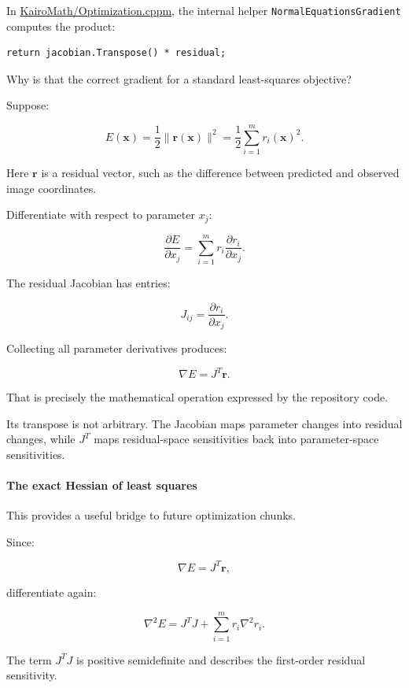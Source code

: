 In \href{https://github.com/swayam8624/KairoMath/blob/master/Optimization.cppm?utm_source=chatgpt.com}{KairoMath/Optimization.cppm}, the internal helper \texttt{NormalEquationsGradient} computes the product:

\begin{verbatim}
return jacobian.Transpose() * residual;
\end{verbatim}

Why is that the correct gradient for a standard least-squares objective?

Suppose:

\[
E(\mathbf x)=\frac12\|\mathbf r(\mathbf x)\|^2 =\frac12\sum_{i=1}^m r_i(\mathbf x)^2.
\]

Here \(\mathbf r\) is a residual vector, such as the difference between predicted and observed image coordinates.

Differentiate with respect to parameter \(x_j\):

\[
\frac{\partial E}{\partial x_j} = \sum_{i=1}^m r_i \frac{\partial r_i}{\partial x_j}.
\]

The residual Jacobian has entries:

\[
J_{ij}=\frac{\partial r_i}{\partial x_j}.
\]

Collecting all parameter derivatives produces:

\[
\boxed{ \nabla E=J^T\mathbf r }.
\]

That is precisely the mathematical operation expressed by the repository code.

Its transpose is not arbitrary. The Jacobian maps parameter changes into residual changes, while \(J^T\) maps residual-space sensitivities back into parameter-space sensitivities.

\paragraph{The exact Hessian of least squares}\label{02-foundations-ii-ch021-the-exact-hessian-of-least-squares}

This provides a useful bridge to future optimization chunks.

Since:

\[
\nabla E=J^T\mathbf r,
\]

differentiate again:

\[
\boxed{ \nabla^2E = J^TJ+ \sum_{i=1}^m r_i\nabla^2r_i }.
\]

The term \(J^TJ\) is positive semidefinite and describes the first-order residual sensitivity.

